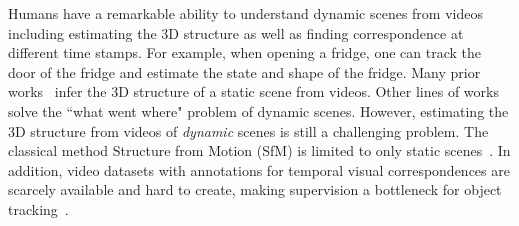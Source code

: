 
Humans have a remarkable ability to understand dynamic scenes from videos including estimating the 3D structure as well as finding correspondence at different time stamps. For example, when opening a fridge, one can track the door of the fridge and estimate the state and shape of the fridge.
Many prior works~\cite{schonberger2016structure, Luo-VideoDepth-2020, lin2019photometric} infer the 3D structure of a static scene from videos. Other lines of works~\cite{sarlin20superglue,CVPR2019_CycleTime,sarlin20superglue, jabri2020walk} solve the ``what went where" \cite{Wills03} problem of dynamic scenes. However, estimating the 3D structure from videos of {\em dynamic} scenes is still a challenging problem. The classical method Structure from Motion (SfM) is limited to only static scenes~\cite{schonberger2016structure, schwarz1978estimating, ozden2010multibody}. In addition, video datasets with annotations for temporal visual correspondences are scarcely available and hard to create, making supervision a bottleneck for object tracking~\cite{li2019joint, wu2013online}. 






